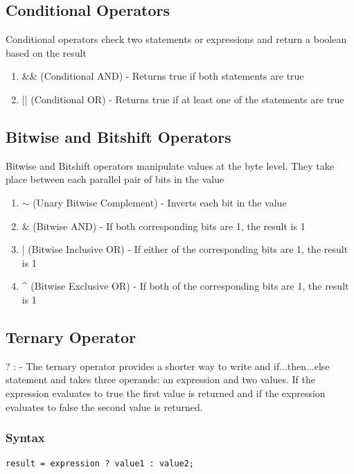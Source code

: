 \documentclass[a4paper]{article}
\begin{document}
\subsection*{Conditional Operators}
Conditional operators check two statements or expressions and return a boolean
based on the result
\begin{enumerate}

\item \&\& (Conditional AND) - Returns true if both statements are true

\item || (Conditional OR) - Returns true if at least one of the statements are
true

\end{enumerate}

\subsection*{Bitwise and Bitshift Operators}
Bitwise and Bitshift operators manipulate values at the byte level. They take
place between each parallel pair of bits in the value
\begin{enumerate}

\item $\sim$ (Unary Bitwise Complement) - Inverts each bit in the value

\item \& (Bitwise AND) - If both corresponding bits are 1, the result is 1

\item | (Bitwise Inclusive OR) - If either of the corresponding bits are 1, the
result is 1

\item \string^ (Bitwise Exclusive OR) - If both of the corresponding bits are 1,
the result is 1

\end{enumerate}

\subsection*{Ternary Operator}
? : - The ternary operator provides a shorter way to write and if...then...else
statement and takes three operands: an expression and two values. If the
expression evaluates to true the first value is returned and if the expression
evaluates to false the second value is returned.

\subsubsection*{Syntax}
\begin{lstlisting}
result = expression ? value1 : value2;
\end{lstlisting}
\end{document}
